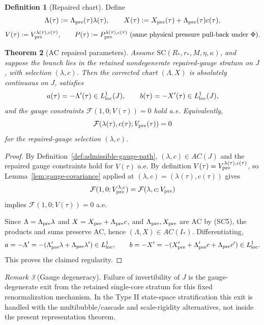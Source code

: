 \documentclass[11pt]{amsart}
\theoremstyle{plain}
\newtheorem{theorem}{Theorem}[section]
\theoremstyle{definition}
\newtheorem{definition}[theorem]{Definition}
\theoremstyle{remark}
\newtheorem{remark}[theorem]{Remark}
\begin{document}
\begin{definition}[Repaired chart]\label{def:repaired-chart}
Define
\[
\Lambda(\tau):=\Lambda_{\rm pre}(\tau)\lambda(\tau),\qquad
X(\tau):=X_{\rm pre}(\tau)+\Lambda_{\rm pre}(\tau)c(\tau),
\]
\[
V(\tau):=V_{\rm pre}^{\lambda(\tau),c(\tau)},\qquad
P(\tau):=P_{\rm pre}^{\lambda(\tau),c(\tau)}\ \text{(same physical pressure pull-back under }\Phi).
\]
\end{definition}

\begin{theorem}[AC repaired parameters]\label{thm:repaired-existence}
Assume \(\mathrm{SC}(R_*,r_*,M,\eta,\kappa)\), and suppose the branch lies in the
retained nondegenerate repaired-gauge stratum on \(J\), with selection
\((\lambda,c)\). Then the corrected
chart \((\Lambda,X)\) is absolutely continuous on \(J\), satisfies
\[
a(\tau)=-\Lambda'(\tau)\in L^1_{\rm loc}(J),\qquad
b(\tau)=-X'(\tau)\in L^1_{\rm loc}(J),
\]
and the gauge constraints \(\mathcal F(1,0;V(\tau))=0\) hold a.e.
Equivalently,
\[
\mathcal F(\lambda(\tau),c(\tau);V_{\rm pre}(\tau))=0
\]
for the repaired-gauge selection \((\lambda,c)\).
\end{theorem}
\begin{proof}
By Definition~\ref{def:admissible-gauge-path}, \((\lambda,c)\in AC(J)\) and the
repaired gauge constraints hold for \(V(\tau)\) a.e.
By definition \(V(\tau)=V_{\rm pre}^{\lambda(\tau),c(\tau)}\), so Lemma~\ref{lem:gauge-covariance}
applied at \((\lambda,c)=(\lambda(\tau),c(\tau))\) gives
\[
\mathcal F(1,0;V_{\rm pre}^{\lambda,c})=\mathcal F(\lambda,c;V_{\rm pre})
\]
implies \(\mathcal F(1,0;V(\tau))=0\) a.e.

Since \(\Lambda=\Lambda_{\rm pre}\lambda\) and \(X=X_{\rm pre}+\Lambda_{\rm pre}c\),
and \(\Lambda_{\rm pre},X_{\rm pre}\) are AC by \textup{(SC5)}, the products and sums
preserve AC, hence \((\Lambda,X)\in AC(I_*)\). Differentiating,
\[
a=-\Lambda' =-(\Lambda_{\rm pre}'\lambda+\Lambda_{\rm pre}\lambda')\in L^1_{\rm loc},\qquad
b=-X' =-(X_{\rm pre}'+\Lambda_{\rm pre}'c+\Lambda_{\rm pre}c')\in L^1_{\rm loc}.
\]
This proves the claimed regularity.
\end{proof}

\begin{remark}[Gauge degeneracy]
Failure of invertibility of \(J\) is the gauge-degenerate exit from the retained
single-core stratum for this fixed renormalization mechanism. In the Type II
state-space stratification this exit is handled with the multibubble/cascade
and scale-rigidity alternatives, not inside the present representation theorem.
\end{remark}
\end{document}

